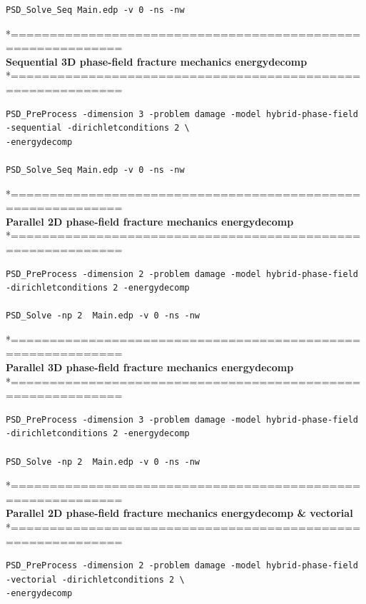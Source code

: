 {{\begin{lstlisting}[style=BashInputStyle]
PSD_Solve_Seq Main.edp -v 0 -ns -nw   
\end{lstlisting}
*============================================================\\
\textbf{ Sequential 3D phase-field fracture mechanics energydecomp }\\
*============================================================\\
\begin{lstlisting}[style=BashInputStyle]
PSD_PreProcess -dimension 3 -problem damage -model hybrid-phase-field -sequential -dirichletconditions 2 \
-energydecomp   

PSD_Solve_Seq Main.edp -v 0 -ns -nw   
\end{lstlisting}
*============================================================\\
\textbf{ Parallel 2D phase-field fracture mechanics energydecomp }\\
*============================================================\\
\begin{lstlisting}[style=BashInputStyle]
PSD_PreProcess -dimension 2 -problem damage -model hybrid-phase-field -dirichletconditions 2 -energydecomp   

PSD_Solve -np 2  Main.edp -v 0 -ns -nw   
\end{lstlisting}
*============================================================\\
\textbf{ Parallel 3D phase-field fracture mechanics energydecomp }\\
*============================================================\\
\begin{lstlisting}[style=BashInputStyle]
PSD_PreProcess -dimension 3 -problem damage -model hybrid-phase-field -dirichletconditions 2 -energydecomp   

PSD_Solve -np 2  Main.edp -v 0 -ns -nw   
\end{lstlisting}
*============================================================\\
\textbf{ Parallel 2D phase-field fracture mechanics energydecomp \& vectorial}\\
*============================================================\\
\begin{lstlisting}[style=BashInputStyle]
PSD_PreProcess -dimension 2 -problem damage -model hybrid-phase-field -vectorial -dirichletconditions 2 \
-energydecomp   


\end{lstlisting}}}
